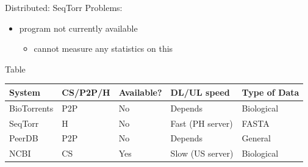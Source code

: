 \documentclass{beamer}
\begin{document}
    
    \begin{frame}{Distributed: SeqTorr}
        Problems: %
        \begin{itemize}
            \item program not currently available
            \begin{itemize}
                \item cannot measure any statistics on this
            \end{itemize}
        \end{itemize}
    \end{frame}
    



    
\begin{frame}{Table}
   \begin{table}[]
        \begin{tabular}{|l|l|l|l|l|}
        \hline
        System      & CS/P2P/H & Available? & DL/UL speed & Type of Data \\ \hline
        BioTorrents & P2P           & No         & Depends                    & Biological  \\ \hline
        SeqTorr     & H             & No         & Fast (PH server)           & FASTA        \\ \hline
        PeerDB      & P2P           & No         & Depends                    & General      \\ \hline
        NCBI        & CS            & Yes        & Slow (US server)           & Biological  \\ \hline
        \end{tabular}
    \end{table} 
\end{frame}


\end{document}

